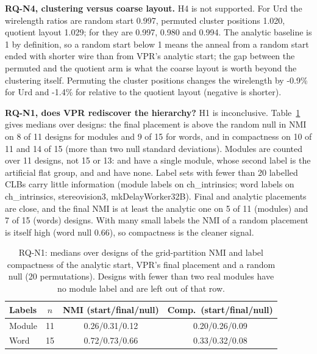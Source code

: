 \textbf{RQ-N4, clustering versus coarse layout.} H4 is not supported. For Urd the wirelength
ratios are random start 0.997, permuted cluster positions 1.020, quotient
layout 1.029; for  they are 0.997, 0.980 and 0.994. The analytic baseline is 1 by definition, so a random start below 1 means the anneal from a random start ended with shorter wire than from VPR's analytic start; the gap between the permuted and the quotient arm is what
the coarse layout is worth beyond the clustering itself. Permuting the cluster positions changes the wirelength by
-0.9\% for Urd and -1.4\% for
 relative to the quotient layout (negative is shorter).

\textbf{RQ-N1, does VPR rediscover the hierarchy?} H1 is inconclusive. Table~\ref{tab:r2n1}
gives medians over designs: the final placement is above the random null in NMI on 8 of 11
designs for modules and 9 of 15 for words, and in compactness on 10 of 11
and 14 of 15 (more than two null standard deviations). Modules are counted over 11 designs, not 15 or 13:
 and  have a single module, whose second label is the artificial flat group, and  and
 have none. Label sets with fewer than 20 labelled CLBs carry little information (module labels on ch\_intrinsics; word labels on ch\_intrinsics, stereovision3, mkDelayWorker32B). Final and analytic placements are close, and the final
NMI is at least the analytic one on 5 of 11 (modules) and 7 of 15
(words) designs. With many small labels the NMI of a random placement is itself high (word null
0.66), so compactness is the cleaner signal.

\begin{table}[t]
\caption{RQ-N1: medians over designs of the grid-partition NMI and label compactness of the
analytic start, VPR's final placement and a random null (20 permutations). Designs with fewer
than two real modules have no module label and are left out of that row.}
\label{tab:r2n1}
\centering
\footnotesize\setlength{\tabcolsep}{3pt}
\begin{tabular}{lccc}
\toprule
Labels & $n$ & NMI (start/final/null) & Comp.\ (start/final/null) \\
\midrule
Module & 11 & 0.26/0.31/0.12 & 0.20/0.26/0.09 \\
Word & 15 & 0.72/0.73/0.66 & 0.33/0.32/0.08 \\
\bottomrule
\end{tabular}
\end{table}

